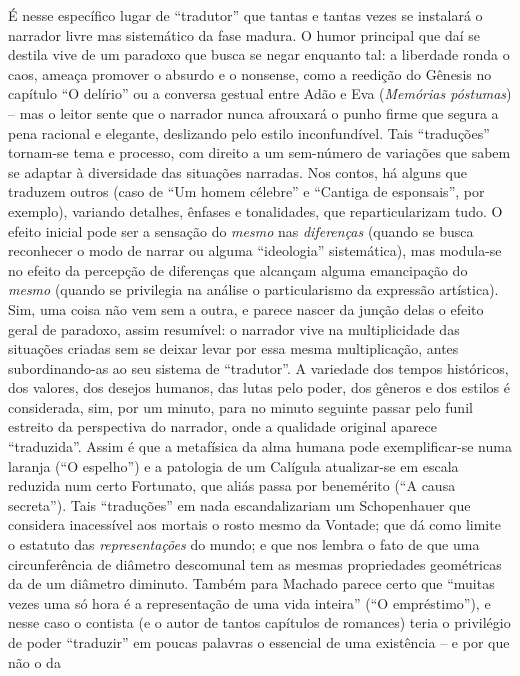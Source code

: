 É nesse específico lugar de ``tradutor'' que tantas e tantas vezes se
instalará o narrador livre mas sistemático da fase madura. O humor
principal que daí se destila vive de um paradoxo que busca se negar
enquanto tal: a liberdade ronda o caos, ameaça promover o absurdo e o
nonsense, como a reedição do Gênesis no capítulo ``O delírio'' ou a
conversa gestual entre Adão e Eva (\emph{Memórias póstumas}) -- mas o
leitor sente que o narrador nunca afrouxará o punho firme que segura a
pena racional e elegante, deslizando pelo estilo inconfundível. Tais
``traduções'' tornam-se tema e processo, com direito a um sem-número de
variações que sabem se adaptar à diversidade das situações narradas. Nos
contos, há alguns que traduzem outros (caso de ``Um homem célebre'' e
``Cantiga de esponsais'', por exemplo), variando detalhes, ênfases e
tonalidades, que reparticularizam tudo. O efeito inicial pode ser a
sensação do \emph{mesmo} nas \emph{diferenças} (quando se busca
reconhecer o modo de narrar ou alguma ``ideologia'' sistemática), mas
modula-se no efeito da percepção de diferenças que alcançam alguma
emancipação do \emph{mesmo} (quando se privilegia na análise o
particularismo da expressão artística). Sim, uma coisa não vem sem a
outra, e parece nascer da junção delas o efeito geral de paradoxo, assim
resumível: o narrador vive na multiplicidade das situações criadas sem
se deixar levar por essa mesma multiplicação, antes subordinando-as ao
seu sistema de ``tradutor''. A variedade dos tempos históricos, dos
valores, dos desejos humanos, das lutas pelo poder, dos gêneros e dos
estilos é considerada, sim, por um minuto, para no minuto seguinte
passar pelo funil estreito da perspectiva do narrador, onde a qualidade
original aparece ``traduzida''. Assim é que a metafísica da alma humana
pode exemplificar-se numa laranja (``O espelho'') e a patologia de um
Calígula atualizar-se em escala reduzida num certo Fortunato, que aliás
passa por benemérito (``A causa secreta''). Tais ``traduções'' em nada
escandalizariam um Schopenhauer que considera inacessível aos mortais o
rosto mesmo da Vontade; que dá como limite o estatuto das
\emph{representações} do mundo; e que nos lembra o fato de que uma
circunferência de diâmetro descomunal tem as mesmas propriedades
geométricas da de um diâmetro diminuto. Também para Machado parece certo
que ``muitas vezes uma só hora é a representação de uma vida inteira''
(``O empréstimo''), e nesse caso o contista (e o autor de tantos
capítulos de romances) teria o privilégio de poder ``traduzir'' em
poucas palavras o essencial de uma existência -- e por que não o da
